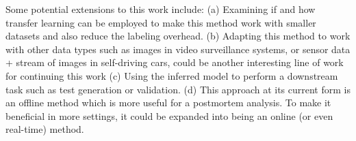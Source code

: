 Some potential extensions to this work include:
(a) Examining if and how transfer learning can be employed to make this method work with smaller datasets and also reduce the labeling overhead. 
(b) Adapting this method to work with other data types such as images in video surveillance systems, or sensor data + stream of images in self-driving cars, could be another interesting line of work for continuing this work
(c) Using the inferred model to perform a downstream task such as test generation or validation. 
(d) This approach at its current form is an offline method which is more useful for a postmortem analysis. To make it beneficial in more settings, it could be expanded into being an online (or even real-time) method.
